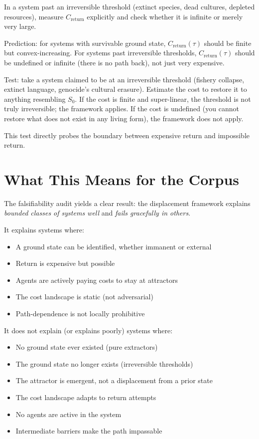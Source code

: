 \documentclass[12pt]{article}
\begin{document}
In a system past an irreversible threshold (extinct species, dead cultures, depleted resources), measure $C_{\text{return}}$ explicitly and check whether it is infinite or merely very large.

Prediction: for systems with survivable ground state, $C_{\text{return}}(\tau)$ should be finite but convex-increasing. For systems past irreversible thresholds, $C_{\text{return}}(\tau)$ should be undefined or infinite (there is no path back), not just very expensive.

Test: take a system claimed to be at an irreversible threshold (fishery collapse, extinct language, genocide's cultural erasure). Estimate the cost to restore it to anything resembling $S_0$. If the cost is finite and super-linear, the threshold is not truly irreversible; the framework applies. If the cost is undefined (you cannot restore what does not exist in any living form), the framework does not apply.

This test directly probes the boundary between expensive return and impossible return.

\section{What This Means for the Corpus}

The falsifiability audit yields a clear result: the displacement framework explains \textit{bounded classes of systems well} and \textit{fails gracefully in others}.

It explains systems where:
\begin{itemize}
\item A ground state can be identified, whether immanent or external
\item Return is expensive but possible
\item Agents are actively paying costs to stay at attractors
\item The cost landscape is static (not adversarial)
\item Path-dependence is not locally prohibitive
\end{itemize}

It does not explain (or explains poorly) systems where:
\begin{itemize}
\item No ground state ever existed (pure extractors)
\item The ground state no longer exists (irreversible thresholds)
\item The attractor is emergent, not a displacement from a prior state
\item The cost landscape adapts to return attempts
\item No agents are active in the system
\item Intermediate barriers make the path impassable
\end{itemize}
\end{document}
